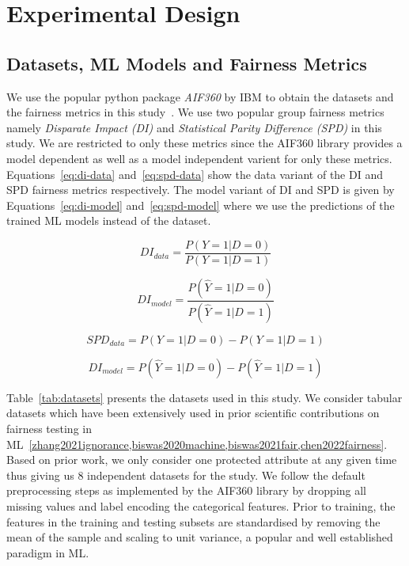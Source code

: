 \documentclass{article}
\begin{document}


\section{Experimental Design}\label{sec:method}

\subsection{Datasets, ML Models and Fairness Metrics}\label{sec:method-parameters}

We use the popular python package \emph{AIF360} by IBM to obtain the
datasets and the fairness metrics in this study \cite{bellamy2019ai}.
We use two popular group fairness metrics namely \emph{Disparate
Impact (DI)} and \emph{Statistical Parity Difference (SPD)} in this
study. We are restricted to only these metrics since the AIF360
library provides a model dependent as well as a model independent
varient for only these metrics. Equations \ref{eq:di-data}
and \ref{eq:spd-data} show the data variant of the DI and SPD fairness
metrics respectively. The model variant of DI and SPD is given by
Equations \ref{eq:di-model} and \ref{eq:spd-model} where we use the
predictions of the trained ML models instead of the dataset.

\begin{equation}
  DI_{data} = \frac{P(Y=1|D=0)}{P(Y=1|D=1)}
  \label{eq:di-data}
\end{equation}

\begin{equation}
  DI_{model} = \frac{P(\hat{Y}=1|D=0)}{P(\hat{Y}=1|D=1)}
  \label{eq:di-model}
\end{equation}

\begin{equation}
  SPD_{data} = P(Y=1|D=0)-P(Y=1|D=1)
  \label{eq:spd-data}
\end{equation}

\begin{equation}
  DI_{model} = P(\hat{Y}=1|D=0)-P(\hat{Y}=1|D=1)
  \label{eq:spd-model}
\end{equation}

Table \ref{tab:datasets} presents the datasets used in this study. We
consider tabular datasets which have been extensively used in prior
scientific contributions on fairness testing in
ML \ref{zhang2021ignorance,biswas2020machine,biswas2021fair,chen2022fairness}.
Based on prior work, we only consider one protected attribute at any
given time thus giving us 8 independent datasets for the study. We
follow the default preprocessing steps as implemented by the AIF360
library by dropping all missing values and label encoding the
categorical features. Prior to training, the features in the training
and testing subsets are standardised by removing the mean of the
sample and scaling to unit variance, a popular and well established
paradigm in ML.
\end{document}
